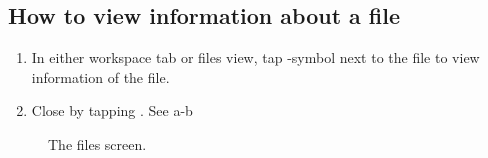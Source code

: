 \subsection{How to view information about a file}

\begin{enumerate}
\item In either workspace tab or files view, tap -symbol next to the file to view information of the file.
\item Close by tapping . See a-b
\end{enumerate}

\begin{figure}[htb]
\caption{The files screen.}
\label{fig:ios_files1}
\end{figure}
\FloatBarrier


